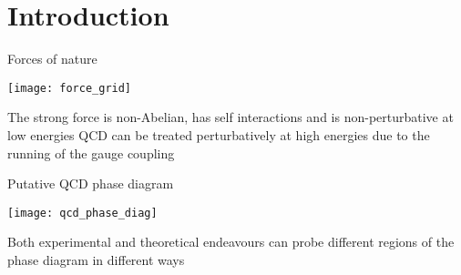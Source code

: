 \section{Introduction}

\begin{frame}{Forces of nature}

  \begin{center}
    \texttt{[image: force\_grid]}
  \end{center}
  \vspace*{-.75\baselineskip}

  \begin{overprint}
      The \alert{strong force} is non-Abelian, has self interactions and is
      non-perturbative at low energies
      QCD can be treated perturbatively at \alert{high energies} due to the \alert{running} of
      the gauge coupling
  \end{overprint}

\end{frame}

\begin{frame}{Putative QCD phase diagram}

  \begin{center}
    \texttt{[image: qcd\_phase\_diag]}
  \end{center}

  \vspace{-1em}

  Both experimental and theoretical endeavours can probe different regions of the
  phase diagram in different ways
  
\end{frame}

